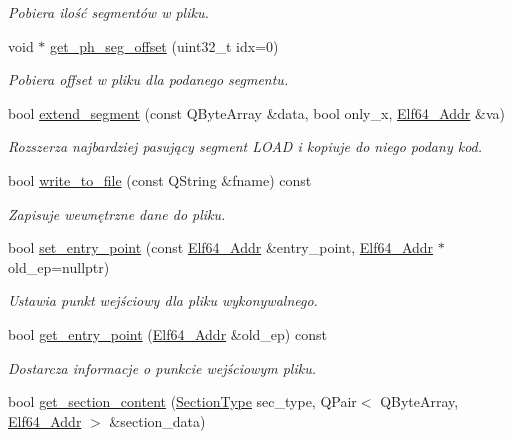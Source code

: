 \begin{DoxyCompactItemize}
\begin{DoxyCompactList}\small\item\em Pobiera ilość segmentów w pliku. \end{DoxyCompactList}\item 
void $\ast$ \hyperlink{class_e_l_f_abdddb77f2822c068b2ae06e221ae1e10}{get\-\_\-ph\-\_\-seg\-\_\-offset} (uint32\-\_\-t idx=0)
\begin{DoxyCompactList}\small\item\em Pobiera offset w pliku dla podanego segmentu. \end{DoxyCompactList}\item 
bool \hyperlink{class_e_l_f_a11f004629212a5651dd4ca1355a7eb9d}{extend\-\_\-segment} (const Q\-Byte\-Array \&data, bool only\-\_\-x, \hyperlink{elf_8h_aeed51d08e3a950d637f8ec1f0cd4ef65}{Elf64\-\_\-\-Addr} \&va)
\begin{DoxyCompactList}\small\item\em Rozszerza najbardziej pasujący segment L\-O\-A\-D i kopiuje do niego podany kod. \end{DoxyCompactList}\item 
bool \hyperlink{class_e_l_f_a52b09dc778fd67aa92d1a80a96e9f580}{write\-\_\-to\-\_\-file} (const Q\-String \&fname) const 
\begin{DoxyCompactList}\small\item\em Zapisuje wewnętrzne dane do pliku. \end{DoxyCompactList}\item 
bool \hyperlink{class_e_l_f_a8342542081d52e5518356f0f6cde3db8}{set\-\_\-entry\-\_\-point} (const \hyperlink{elf_8h_aeed51d08e3a950d637f8ec1f0cd4ef65}{Elf64\-\_\-\-Addr} \&entry\-\_\-point, \hyperlink{elf_8h_aeed51d08e3a950d637f8ec1f0cd4ef65}{Elf64\-\_\-\-Addr} $\ast$old\-\_\-ep=nullptr)
\begin{DoxyCompactList}\small\item\em Ustawia punkt wejściowy dla pliku wykonywalnego. \end{DoxyCompactList}\item 
bool \hyperlink{class_e_l_f_adf71ac4ae5cfedb1b1415b2f5da2494f}{get\-\_\-entry\-\_\-point} (\hyperlink{elf_8h_aeed51d08e3a950d637f8ec1f0cd4ef65}{Elf64\-\_\-\-Addr} \&old\-\_\-ep) const 
\begin{DoxyCompactList}\small\item\em Dostarcza informacje o punkcie wejściowym pliku. \end{DoxyCompactList}\item 
bool \hyperlink{class_e_l_f_aaa7edcb97e8cd8b0ca759d7df7984b12}{get\-\_\-section\-\_\-content} (\hyperlink{class_e_l_f_abaebdfb7048441e430684d68df8d73d1}{Section\-Type} sec\-\_\-type, Q\-Pair$<$ Q\-Byte\-Array, \hyperlink{elf_8h_aeed51d08e3a950d637f8ec1f0cd4ef65}{Elf64\-\_\-\-Addr} $>$ \&section\-\_\-data)

\end{DoxyCompactItemize}
